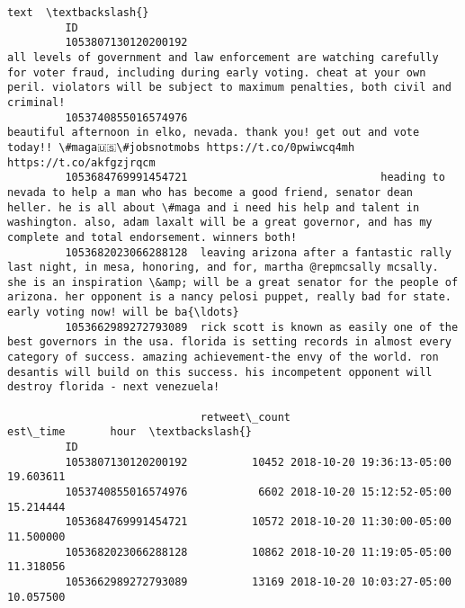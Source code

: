 \documentclass[11pt]{article}
\begin{document}
\begin{Verbatim}[commandchars=\\\{\}]
                                                                                                                                                                                                                                                                                                                 text  \textbackslash{}
         ID                                                                                                                                                                                                                                                                                                             
         1053807130120200192                                                                    all levels of government and law enforcement are watching carefully for voter fraud, including during early voting. cheat at your own peril. violators will be subject to maximum penalties, both civil and criminal!   
         1053740855016574976                                                                                                                                             beautiful afternoon in elko, nevada. thank you! get out and vote today!! \#maga🇺🇸\#jobsnotmobs https://t.co/0pwiwcq4mh https://t.co/akfgzjrqcm   
         1053684769991454721                              heading to nevada to help a man who has become a good friend, senator dean heller. he is all about \#maga and i need his help and talent in washington. also, adam laxalt will be a great governor, and has my complete and total endorsement. winners both!   
         1053682023066288128  leaving arizona after a fantastic rally last night, in mesa, honoring, and for, martha @repmcsally mcsally. she is an inspiration \&amp; will be a great senator for the people of arizona. her opponent is a nancy pelosi puppet, really bad for state. early voting now! will be ba{\ldots}   
         1053662989272793089  rick scott is known as easily one of the best governors in the usa. florida is setting records in almost every category of success. amazing achievement-the envy of the world. ron desantis will build on this success. his incompetent opponent will destroy florida - next venezuela!   
         
                              retweet\_count                  est\_time       hour  \textbackslash{}
         ID                                                                        
         1053807130120200192          10452 2018-10-20 19:36:13-05:00  19.603611   
         1053740855016574976           6602 2018-10-20 15:12:52-05:00  15.214444   
         1053684769991454721          10572 2018-10-20 11:30:00-05:00  11.500000   
         1053682023066288128          10862 2018-10-20 11:19:05-05:00  11.318056   
         1053662989272793089          13169 2018-10-20 10:03:27-05:00  10.057500   
         

\end{Verbatim}
\end{document}
